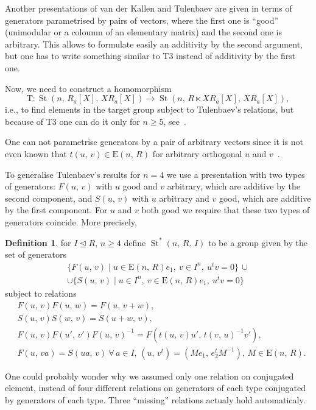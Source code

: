 \documentclass[11pt]{amsart}
\theoremstyle{plain} \declaretheorem[name=Theorem, Refname={Theorem,Theorems}]{tm} \Crefname{tm}{Theorem}{Theorems}
\numberwithin{equation}{section}
\theoremstyle{definition} \newtheorem{df}[lm]{Definition} \Crefname{df}{Definition}{Definitions}
\theoremstyle{remark} \newtheorem{rk}[lm]{Remark} \Crefname{rk}{Remark}{Remarks}
\newcommand{\E}{{\mathrm{E}}}
\newcommand{\St}{\mathop{\mathrm{St}}\nolimits}
\newcommand{\inv}{^{-1}}
\begin{document}
Another presentations of van der Kallen and Tulenbaev are given in terms of generators parametrised by pairs of vectors, where the first one is ``good'' (unimodular or a coloumn of an elementary matrix) and the second one is arbitrary. This allows to formulate easily an additivity by the second argument, but one has to write something similar to T3 instead of additivity by the first one.

Now, we need to construct a homomorphism
$$
\mathrm T\colon\St(n,\,R_a[X],\,XR_a[X])\rightarrow\St(n,\,R\ltimes XR_a[X],\,XR_a[X]),
$$
i.e., to find elements in the target group subject to Tulenbaev's relations, but because of T3 one can do it only for $n\geq5$, see~\cite[Lemmas~1.2 and~1.3\,c)]{Tul}.

One can not parametrise generators by a pair of arbitrary vectors since it is not even known that $t(u,\,v)\in\E(n,\,R)$ for arbitrary orthogonal $u$ and $v$~\cite{Rao}. 

To generalise Tulenbaev's results for $n=4$ we use a presentation with two types of generators: $F(u,\,v)$ with $u$ good and $v$ arbitrary, which are additive by the second component, and $S(u,\,v)$ with $u$ arbitrary and $v$ good, which are additive by the first component. For $u$ and $v$ both good we require that these two types of generators coincide. More precisely,

\begin{df}
for $I\trianglelefteq R$, $n\geq4$ define $\St^*(n,\,R,\,I)$ to be a group given by the set of generators
\begin{multline*}
\{F(u,\,v)\mid u\in\E(n,\,R)e_1,\ v\in I^n,\ u^tv=0\}\,\cup\\
\cup\{S(u,\,v)\mid u\in I^n,\ v\in\E(n,\,R)e_1,\ u^tv=0\}
\end{multline*}
subject to relations
\setcounter{equation}{0}
\renewcommand{\theequation}{R\arabic{equation}}
\begin{align}
&F(u,\,v)F(u,\,w)=F(u,\,v+w),\\
&S(u,\,v)S(w,\,v)=S(u+w,\,v),\\
&F(u,\,v)F(u',\,v')F(u,\,v)\inv=F(t(u,\,v)u',\,t(v,\,u)\inv v'),\\
&F(u,\,va)=S(ua,\,v)\ \forall\,a\in I,\,(u,\,v^t)=(Me_1,\,e_2^tM\inv),\,M\!\in\E(n,\,R).
\end{align}
\end{df}

One could probably wonder why we assumed only one relation on conjugated element, instead of four different relations on generators of each type conjugated by generators of each type. Three ``missing'' relations actualy hold automaticaly.
\end{document}
